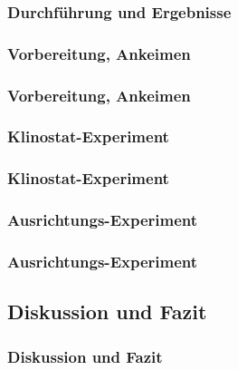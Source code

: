 \documentclass[aspectratio=169]{beamer}
\begin{document}
	\begin{frame}
		\frametitle{Durchführung und Ergebnisse}
	\end{frame}
	
	\subsubsection{Vorbereitung, Ankeimen}
	
	\begin{frame}
		\frametitle{Vorbereitung, Ankeimen}
	\end{frame}
	
	\subsubsection{Klinostat-Experiment}
	
	\begin{frame}
		\frametitle{Klinostat-Experiment}
	\end{frame}
	
	\subsubsection{Ausrichtungs-Experiment}
	
	\begin{frame}
		\frametitle{Ausrichtungs-Experiment}
	\end{frame}
	
	\subsection{Diskussion und Fazit}
	
	\begin{frame}
		\frametitle{Diskussion und Fazit}
	\end{frame}
\end{document}

